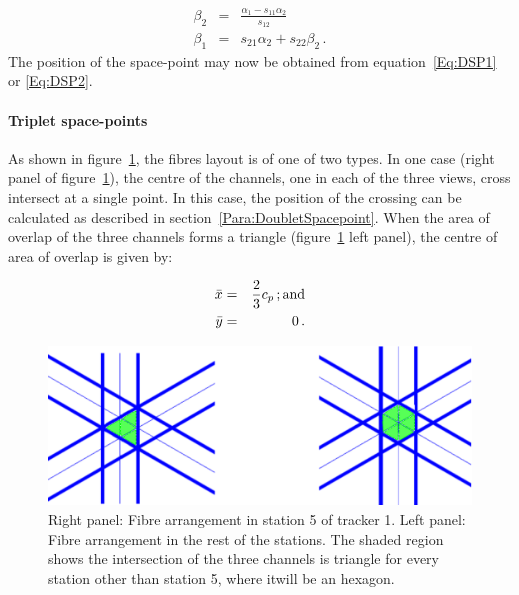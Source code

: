 \begin{eqnarray}
  \beta_2 & = & \frac{\alpha_1 - s_{11} \alpha_2}{s_{12}}     \\
  \beta_1 & = & s_{21} \alpha_2 + s_{22} \beta_2 \, .
\end{eqnarray}
The position of the space-point may now be obtained from equation~\ref{Eq:DSP1} or \ref{Eq:DSP2}.

\paragraph{Triplet space-points}

As shown in figure~\ref{Fig:SenseArea}, the fibres layout is of one of two types. In one case (right panel of figure~\ref{Fig:SenseArea}), the centre of the channels, one in each of the three views, cross intersect at a single point. In this case, the position of the crossing can be calculated as described in section~\ref{Para:DoubletSpacepoint}. When the area of overlap of the three channels forms a triangle (figure~\ref{Fig:SenseArea} left panel), the centre of area of overlap is given by:

\begin{eqnarray}
  \bar{x} & = & \frac{2}{3}c_p \, {\rm ; and}       \\
  \bar{y} & = & 0 \, .
\end{eqnarray}

\begin{figure}
    \includegraphics[width=0.7\linewidth]{detectors/tracker/04-Reconstruction/04-02-Space-points/Figures/SpacepointError.pdf}
  \caption{Right panel: Fibre arrangement in station 5 of tracker 1. Left panel: Fibre arrangement in the rest of the stations. The shaded region shows the intersection of the three channels is triangle for every station other than station 5, where itwill be an hexagon.}
  \label{Fig:SenseArea}
\end{figure}
